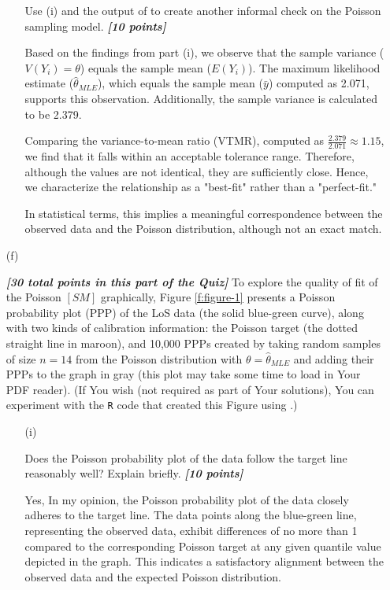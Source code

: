 \documentclass[12pt]{article}
\newcommand{\bi}[1]{\b{\i{#1}}}
\renewcommand{\b}[1]{\textbf{#1}}
\renewcommand{\i}[1]{\textit{#1}}
\renewcommand{\t}[1]{\texttt{#1}}
\begin{document}
\begin{itemize}
\begin{itemize}
Use (i) and the output of \fbox{\t{Code Block 1}} to create another informal check on the Poisson sampling model. \bi{[10 points]}

{\color{blue}
Based on the findings from part (i), we observe that the sample variance (\(V(Y_i) = \theta\)) equals the sample mean (\(E(Y_i)\)). The maximum likelihood estimate (\(\hat{\theta}_{MLE}\)), which equals the sample mean (\(\bar{y}\)) computed as 2.071, supports this observation. Additionally, the sample variance is calculated to be 2.379.

Comparing the variance-to-mean ratio (VTMR), computed as \(\frac{2.379}{2.071} \approx 1.15\), we find that it falls within an acceptable tolerance range. Therefore, although the values are not identical, they are sufficiently close. Hence, we characterize the relationship as a "best-fit" rather than a "perfect-fit."

In statistical terms, this implies a meaningful correspondence between the observed data and the Poisson distribution, although not an exact match.

}
\end{itemize}






\item[(f)]

\bi{[30 total points in this part of the Quiz]} To explore the quality of fit of the Poisson $[SM]$ graphically, Figure \ref{f:figure-1} presents a Poisson probability plot (PPP) of the LoS data (the solid blue-green curve), along with two kinds of calibration information: the Poisson target (the dotted straight line in maroon), and 10,000 PPPs created by taking random samples of size $n = 14$ from the Poisson distribution with $\theta = \hat{ \theta }_{ MLE }$ and adding their PPPs to the graph in gray (this plot may take some time to load in Your PDF reader). (If You wish (not required as part of Your solutions), You can experiment with the \t{R} code that created this Figure using \fbox{\t{Code Block 4}} .)

\begin{itemize}

\item[(i)]

Does the Poisson probability plot of the data follow the target line reasonably well? Explain briefly. \bi{[10 points]}

{\color{blue} Yes, In my opinion, the Poisson probability plot of the data closely adheres to the target line. The data points along the blue-green line, representing the observed data, exhibit differences of no more than 1 compared to the corresponding Poisson target at any given quantile value depicted in the graph. This indicates a satisfactory alignment between the observed data and the expected Poisson distribution.
}


\end{itemize}
\end{itemize}
\end{document}
